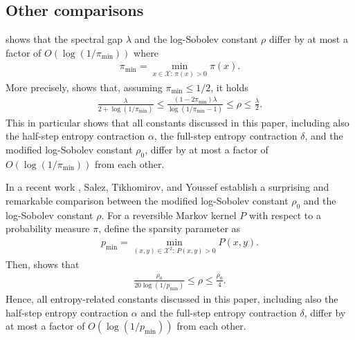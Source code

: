 \documentclass[11pt]{article}
\def\cX{\mathcal{X}}
\theoremstyle{definition}
\begin{document}
\subsection{Other comparisons} \label{sec:comparison:other}
\cite{diaconis1996logarithmic} shows that the spectral gap $\lambda$ and the log-Sobolev constant $\rho$ differ by at most a factor of $O(\log(1/\pi_{\min}))$ where
\begin{align}
    \pi_{\min} = \min_{x \in \cX:\, \pi(x) > 0} \pi(x).
\end{align}
More precisely, \cite[Corollay A.4]{diaconis1996logarithmic} shows that, assuming $\pi_{\min} \le 1/2$, it holds
\begin{align}
    \frac{\lambda}{2 + \log(1/\pi_{\min})} \le
    \frac{(1-2\pi_{\min})\lambda}{\log(1/\pi_{\min} - 1)} \le \rho \le \frac{\lambda}{2}.
\end{align}
This in particular shows that all constants discussed in this paper, including also the half-step entropy contraction $\alpha$, the full-step entropy contraction $\delta$, and the modified log-Sobolev constant $\rho_0$, differ by at most a factor of $O(\log(1/\pi_{\min}))$ from each other.

In a recent work \cite{salez2023upgrading}, Salez, Tikhomirov, and Youssef establish a surprising and remarkable comparison between the modified log-Sobolev constant $\rho_0$ and the log-Sobolev constant $\rho$. For a reversible Markov kernel $P$ with respect to a probability measure $\pi$, define the sparsity parameter as
\begin{align}
    p_{\min} = \min_{(x,y) \in \cX^2:\, P(x,y) > 0} P(x,y).
\end{align}
Then, \cite[Theorem 1]{salez2023upgrading} shows that
\begin{align}
    \frac{\rho_0}{20 \log(1/p_{\min})} \le \rho \le \frac{\rho_0}{4}.
\end{align}
Hence, all entropy-related constants discussed in this paper, including also the half-step entropy contraction $\alpha$ and the full-step entropy contraction $\delta$, differ by at most a factor of $O(\log(1/p_{\min}))$ from each other.
\end{document}
